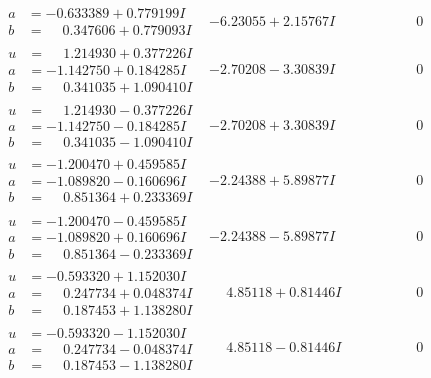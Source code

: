 \documentclass[1p]{elsarticle_modified}
\theoremstyle{definition}
\begin{document}
$$\begin{array}{c|c|c}
\begin{aligned}
a &= -0.633389 + 0.779199 I \\
b &= \phantom{-}0.347606 + 0.779093 I\end{aligned}
 & -6.23055 + 2.15767 I & \phantom{-0.000000 } 0 \\ \hline\begin{aligned}
u &= \phantom{-}1.214930 + 0.377226 I \\
a &= -1.142750 + 0.184285 I \\
b &= \phantom{-}0.341035 + 1.090410 I\end{aligned}
 & -2.70208 - 3.30839 I & \phantom{-0.000000 } 0 \\ \hline\begin{aligned}
u &= \phantom{-}1.214930 - 0.377226 I \\
a &= -1.142750 - 0.184285 I \\
b &= \phantom{-}0.341035 - 1.090410 I\end{aligned}
 & -2.70208 + 3.30839 I & \phantom{-0.000000 } 0 \\ \hline\begin{aligned}
u &= -1.200470 + 0.459585 I \\
a &= -1.089820 - 0.160696 I \\
b &= \phantom{-}0.851364 + 0.233369 I\end{aligned}
 & -2.24388 + 5.89877 I & \phantom{-0.000000 } 0 \\ \hline\begin{aligned}
u &= -1.200470 - 0.459585 I \\
a &= -1.089820 + 0.160696 I \\
b &= \phantom{-}0.851364 - 0.233369 I\end{aligned}
 & -2.24388 - 5.89877 I & \phantom{-0.000000 } 0 \\ \hline\begin{aligned}
u &= -0.593320 + 1.152030 I \\
a &= \phantom{-}0.247734 + 0.048374 I \\
b &= \phantom{-}0.187453 + 1.138280 I\end{aligned}
 & \phantom{-}4.85118 + 0.81446 I & \phantom{-0.000000 } 0 \\ \hline\begin{aligned}
u &= -0.593320 - 1.152030 I \\
a &= \phantom{-}0.247734 - 0.048374 I \\
b &= \phantom{-}0.187453 - 1.138280 I\end{aligned}
 & \phantom{-}4.85118 - 0.81446 I & \phantom{-0.000000 } 0\\

\end{array}$$
\end{document}
